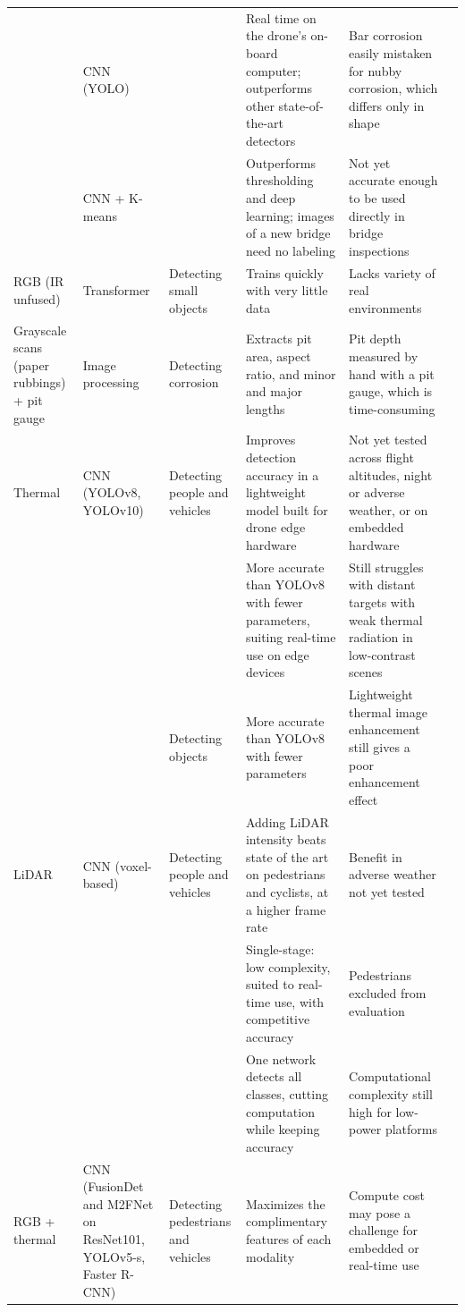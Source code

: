 {\begin{xltabular}{\textwidth}{>{\RaggedRight\arraybackslash}p{1.6cm}>{\RaggedRight\arraybackslash}p{2.2cm}>{\RaggedRight\arraybackslash}p{2.3cm}>{\RaggedRight\arraybackslash}X>{\RaggedRight\arraybackslash}Xp{0.95cm}}
 & CNN (YOLO) &  & Real time on the drone's on-board computer; outperforms other state-of-the-art detectors & Bar corrosion easily mistaken for nubby corrosion, which differs only in shape & \citep{Yu2023} \\
 & CNN + K-means &  & Outperforms thresholding and deep learning; images of a new bridge need no labeling & Not yet accurate enough to be used directly in bridge inspections & \citep{HerndonTien2025} \\
\midrule
RGB (IR unfused) & Transformer & Detecting small objects & Trains quickly with very little data & Lacks variety of real environments & \citep{Zhang2026c} \\
\midrule
Grayscale scans (paper rubbings) + pit gauge & Image processing & Detecting corrosion & Extracts pit area, aspect ratio, and minor and major lengths & Pit depth measured by hand with a pit gauge, which is time-consuming & \citep{Khodabux2021a} \\
\midrule
Thermal & CNN (YOLOv8, YOLOv10) & Detecting people and vehicles & Improves detection accuracy in a lightweight model built for drone edge hardware & Not yet tested across flight altitudes, night or adverse weather, or on embedded hardware & \citep{Liu2026c} \\
 &  &  & More accurate than YOLOv8 with fewer parameters, suiting real-time use on edge devices & Still struggles with distant targets with weak thermal radiation in low-contrast scenes & \citep{Wang2024b} \\
 &  & Detecting objects & More accurate than YOLOv8 with fewer parameters & Lightweight thermal image enhancement still gives a poor enhancement effect & \citep{Wen2025} \\
\midrule
LiDAR & CNN (voxel-based) & Detecting people and vehicles & Adding LiDAR intensity beats state of the art on pedestrians and cyclists, at a higher frame rate & Benefit in adverse weather not yet tested & \citep{Naich2024} \\
 &  &  & Single-stage: low complexity, suited to real-time use, with competitive accuracy & Pedestrians excluded from evaluation & \citep{Prasanth2026} \\
 &  &  & One network detects all classes, cutting computation while keeping accuracy & Computational complexity still high for low-power platforms & \citep{Soumya2026} \\
\midrule
RGB + thermal & CNN (FusionDet and M2FNet on ResNet101, YOLOv5-s, Faster R-CNN) & Detecting pedestrians and vehicles & Maximizes the complimentary features of each modality & Compute cost may pose a challenge for embedded or real-time use & \citep{Hou2024} \\

\end{xltabular}}
